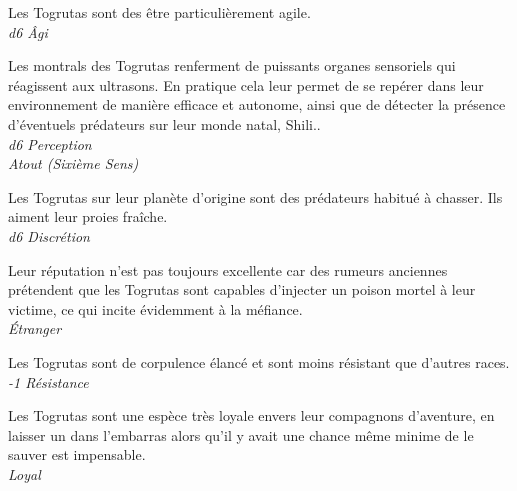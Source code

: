 \begin{description}[align=left]
\item [Agilité] 				%
		Les Togrutas sont des être particulièrement agile.\\
		\emph{d6 \^Agi}

\item [Montrals] 				%
		Les montrals des Togrutas renferment de puissants organes sensoriels qui réagissent aux ultrasons. En pratique cela leur permet de se repérer dans leur environnement de manière efficace et autonome, ainsi que de détecter la présence d’éventuels prédateurs sur leur monde natal, Shili..\\
		\emph{d6 Perception}\\
		\emph{Atout (Sixième Sens)}

\item [Prédateur né] 			%
		Les Togrutas sur leur planète d’origine sont des prédateurs habitué à chasser. Ils aiment leur proies fraîche.\\
		\emph{d6 Discrétion}

\item [Mauvaise réputation] 	%
		Leur réputation n’est pas toujours excellente car des rumeurs anciennes prétendent que les Togrutas sont capables d’injecter un poison mortel à leur victime, ce qui incite évidemment à la méfiance.\\
		\emph{\'Etranger}

\item [Frêle] 					%
		Les Togrutas sont de corpulence élancé et sont moins résistant que d’autres races.\\
		\emph{-1 Résistance}

\item [Un pour tous] 			%
		Les Togrutas sont une espèce très loyale envers leur compagnons d’aventure, en laisser un dans l’embarras alors qu’il y avait une chance même minime de le sauver est impensable.\\
		\emph{Loyal}
\end{description}